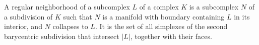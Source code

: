 A regular neighborhood of a subcomplex $L$ of a complex $K$ is a subcomplex $N$ of a subdivision of $K$ such that $N$ is a manifold with boundary containing $L$ in its interior, and $N$ collapses to $L$. It is the set of all simplexes of the second barycentric subdivision that intersect $|L|$, together with their faces.
